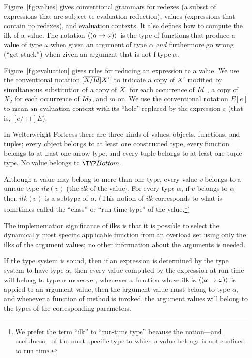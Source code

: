 

Figure~\ref{fig:values} gives conventional grammars for redexes (a subset of expressions that are subject to evaluation reduction),
values (expressions that contain no redexes), and evaluation contexts.  It also defines how to compute the ilk of a value.
The notation $\langle{\mbox{\ensuremath{({\alpha} \rightarrow {\omega})}}}\rangle$ is the type of functions that produce a value of type $\omega$ when
given an argument of type $\alpha$ \emph{and} furthermore go wrong (``get stuck'') when given an argument that is not
f type $\alpha$.



Figure~\ref{fig:evaluation} gives rules for reducing an expression to a value.
We use the conventional notation $[\overline{X/\mathit{Id}}]X']$ to indicate a copy of $X'$
modified by simultaneous substitution of a copy of $X_1$ for each occurrence of $\mathit{Id}_1$,
a copy of $X_2$ for each occurrence of $\mathit{Id}_2$, and so on.
We use the conventional notation $E[e]$ to mean an evaluation context with its ``hole''
replaced by the expression $e$ (that is, $[e/\Box]E$).



In Welterweight Fortress there are three kinds of values: 
objects, functions, and tuples;
every object belongs to at least one constructed type,
every function belongs to at least one arrow type,
and every tuple belongs to at least one tuple type.
No value belongs to $\Bottom$.



Although a value may belong to more than one type, 
every value $v$ belongs to a unique type $\mathit{ilk}(v)$
(the \emph{ilk} of the value).
For every type $\alpha$,
if $v$ belongs to $\alpha$ then $\mathit{ilk}(v)$ is a subtype of $\alpha$.
(This notion of \emph{ilk} corresponds to what is sometimes called the
``class'' or ``run-time type'' of the value.\footnote{%
We prefer the term ``ilk'' to ``run-time type'' 
because the notion---and usefulness---of 
the most specific type to which a value belongs 
is not confined to run time.})

The implementation significance of ilks is that it is possible to
select the dynamically most specific applicable function
from an overload set using only the ilks of the argument values; no
other information about the arguments is needed.

If the type system is sound, then
if an expression is determined by the type system to have type $\alpha$,
then every value computed by the expression at run time
will belong to type $\alpha$
moreover, 
whenever a function whose ilk is $\langle{\mbox{\ensuremath{({\alpha} \rightarrow {\omega})}}}\rangle$ is applied to an argument value,
then the argument value must belong to type $\alpha$, and whenever a function of method is invoked,
the argument values will belong to the types of the corresponding parameters.

\clearpage
